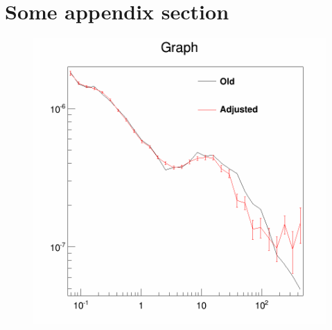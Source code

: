 
\appendix
{}

\section{Some appendix section}
\label{app:fitresults}


\begin{figure}[H]
  \centering
  \begin{minipage}[h]{0.45\textwidth}
  	\centering
	\includegraphics[width=1.\linewidth]{pic/method/app_iso_process_1.png}
  	\subcaption{}
  	\label{app:app_iso_process_1}
  \end{minipage}
  \hfill
  \begin{minipage}[h]{0.45\textwidth}
  	\centering

\end{minipage}
\end{figure}
